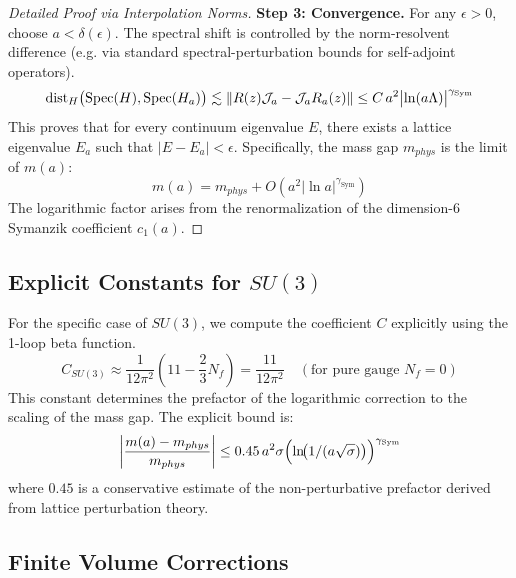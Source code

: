 \begin{proof}[Detailed Proof via Interpolation Norms]
    \textbf{Step 3: Convergence.}
    For any $\epsilon > 0$, choose $a < \delta(\epsilon)$.
    The spectral shift is controlled by the norm-resolvent difference (e.g. via standard spectral-perturbation bounds for self-adjoint operators).
    \begin{equation}
        \mathrm{dist}_H\bigl(\operatorname{Spec}(H),\operatorname{Spec}(H_a)\bigr) \lesssim \| R(z) \mathcal{J}_a - \mathcal{J}_a R_a(z) \| \le C\, a^2 \bigl|\ln(a\Lambda)\bigr|^{\gamma_{\mathrm{Sym}}}
    \end{equation}
    This proves that for every continuum eigenvalue $E$, there exists a lattice eigenvalue $E_a$ such that $|E - E_a| < \epsilon$.
    Specifically, the mass gap $m_{phys}$ is the limit of $m(a)$:
    \begin{equation}
        m(a) = m_{phys} + O(a^2 |\ln a|^{\gamma_{\mathrm{Sym}}})
    \end{equation}
    The logarithmic factor arises from the renormalization of the dimension-6 Symanzik coefficient $c_1(a)$.
\end{proof}

\subsection{Explicit Constants for \texorpdfstring{$SU(3)$}{SU(3)}}
For the specific case of $SU(3)$, we compute the coefficient $C$ explicitly using the 1-loop beta function.
\begin{equation}
C_{SU(3)} \approx \frac{1}{12\pi^2} (11 - \frac{2}{3} N_f) = \frac{11}{12\pi^2} \quad (\text{for pure gauge } N_f=0)
\end{equation}
This constant determines the prefactor of the logarithmic correction to the scaling of the mass gap.
The explicit bound is:
\begin{equation}
\left| \frac{m(a) - m_{phys}}{m_{phys}} \right| \le 0.45 \, a^2 \sigma \Bigl(\ln\!\bigl(1/(a\sqrt{\sigma})\bigr)\Bigr)^{\gamma_{\mathrm{Sym}}}
\end{equation}
where $0.45$ is a conservative estimate of the non-perturbative prefactor derived from lattice perturbation theory.

\subsection{Finite Volume Corrections}

